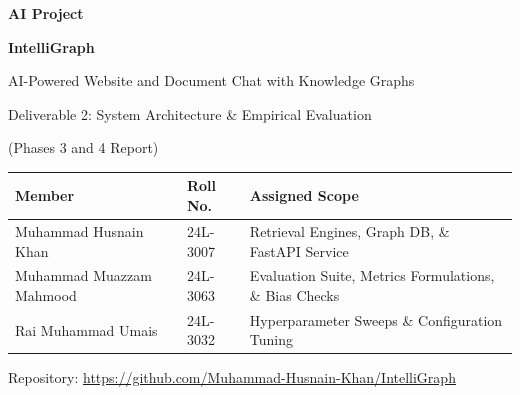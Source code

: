 \documentclass[11pt,a4paper]{article}
\begin{document}
\begin{titlepage}
\centering
\vspace*{2cm}
{\Large\bfseries AI Project\par}
\vspace{0.6cm}
{\Huge\bfseries IntelliGraph\par}
\vspace{0.3cm}
{\Large AI-Powered Website and Document Chat with Knowledge Graphs\par}
\vspace{1.2cm}
{\LARGE Deliverable 2: System Architecture \& Empirical Evaluation\par}
\vspace{0.4cm}
{\Large (Phases 3 and 4 Report)\par}
\vspace{1.5cm}
\begin{tabular}{lll}
\toprule
\textbf{Member} & \textbf{Roll No.} & \textbf{Assigned Scope} \\
\midrule
Muhammad Husnain Khan & 24L-3007 & Retrieval Engines, Graph DB, \& FastAPI Service \\
Muhammad Muazzam Mahmood & 24L-3063 & Evaluation Suite, Metrics Formulations, \& Bias Checks \\
Rai Muhammad Umais & 24L-3032 & Hyperparameter Sweeps \& Configuration Tuning \\
\bottomrule
\end{tabular}
\vspace{1.5cm}

Repository: \url{https://github.com/Muhammad-Husnain-Khan/IntelliGraph}
\vfill
\end{titlepage}
\end{document}
